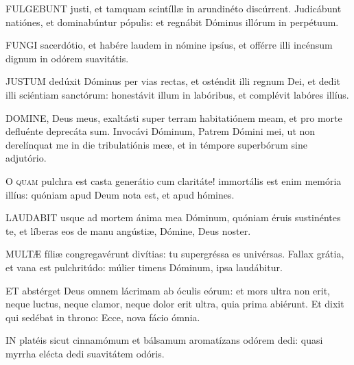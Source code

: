 
\lettrine[lines=2]{F}{ULGEBUNT} justi, et tamquam scintíllæ in arundinéto discúrrent. Judicábunt natiónes, et dominabúntur pópulis: et regnábit Dóminus illórum in perpétuum.


\lettrine[lines=2]{F}{UNGI} sacerdótio, et habére laudem in nómine ipsíus, et offérre illi incénsum dignum in odórem suavitátis.


\lettrine[lines=2]{J}{USTUM} dedúxit Dóminus per vias rectas, et osténdit illi regnum Dei, et dedit illi sciéntiam sanctórum: honestávit illum in labóribus, et complévit labóres illíus.


\lettrine[lines=2]{D}{OMINE}, Deus meus, exaltásti super terram habitatiónem meam, et pro morte defluénte deprecáta sum. Invocávi Dóminum, Patrem Dómini mei, ut non derelínquat me in die tribulatiónis meæ, et in témpore superbórum sine adjutório.


\lettrine[lines=2]{O}{} \textsc{quam} pulchra est casta generátio cum claritáte! immortális est enim memória illíus: quóniam apud Deum nota est, et apud hómines.


\lettrine[lines=2]{L}{AUDABIT} usque ad mortem ánima mea Dóminum, quóniam éruis sustinéntes te, et líberas eos de manu angústiæ, Dómine, Deus noster.


\lettrine[lines=2]{M}{ULTÆ} fíliæ congregavérunt divítias: tu supergréssa es univérsas. Fallax grátia, et vana est pulchritúdo: múlier timens Dóminum, ipsa laudábitur.


\lettrine[lines=2]{E}{T} abstérget Deus omnem lácrimam ab óculis eórum: et mors ultra non erit, neque luctus, neque clamor, neque dolor erit ultra, quia prima abiérunt. Et dixit qui sedébat in throno: Ecce, nova fácio ómnia.


\lettrine[lines=2]{I}{N} platéis sicut cinnamómum et bálsamum aromatízans odórem dedi: quasi myrrha elécta dedi suavitátem odóris.

